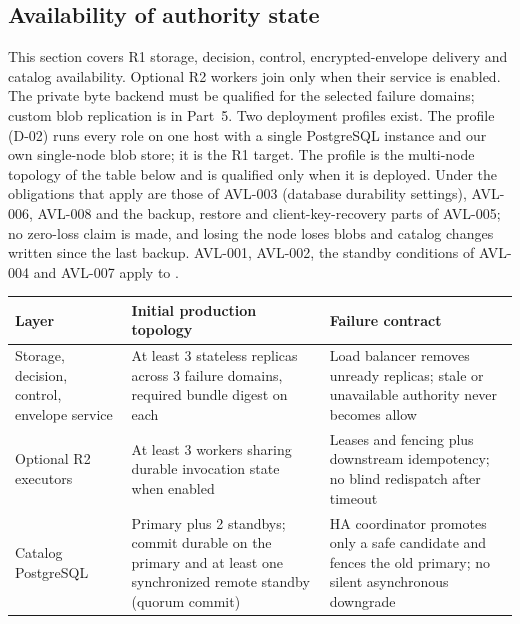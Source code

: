 \subsection{Availability of authority state}\label{sec:availability}
This section covers R1 storage, decision, control, encrypted-envelope delivery and catalog availability. Optional R2 workers join only when their service is enabled. The private byte backend must be qualified for the selected failure domains; custom blob replication is in Part~5. Two deployment profiles exist. The  profile (D-02) runs every role on one host with a single PostgreSQL instance and our own single-node blob store; it is the R1 target. The  profile is the multi-node topology of the table below and is qualified only when it is deployed. Under  the obligations that apply are those of AVL-003 (database durability settings), AVL-006, AVL-008 and the backup, restore and client-key-recovery parts of AVL-005; no zero-loss claim is made, and losing the node loses blobs and catalog changes written since the last backup. AVL-001, AVL-002, the standby conditions of AVL-004 and AVL-007 apply to .
\begin{longtable}{@{}P{0.20\textwidth}P{0.40\textwidth}P{0.30\textwidth}@{}}
\toprule Layer & Initial production topology & Failure contract\\\midrule\endhead
Storage, decision, control, envelope service & At least 3 stateless replicas across 3 failure domains, required bundle digest on each & Load balancer removes unready replicas; stale or unavailable authority never becomes allow\\
Optional R2 executors & At least 3 workers sharing durable invocation state when enabled & Leases and fencing plus downstream idempotency; no blind redispatch after timeout\\
Catalog PostgreSQL & Primary plus 2 standbys; commit durable on the primary and at least one synchronized remote standby (quorum commit) & HA coordinator promotes only a safe candidate and fences the old primary; no silent asynchronous downgrade\\
\bottomrule
\end{longtable}
